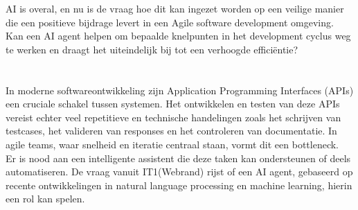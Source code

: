 AI is overal, en nu is de vraag hoe dit kan ingezet worden op een veilige manier die een positieve bijdrage levert in een Agile software development omgeving. Kan een AI agent helpen om bepaalde knelpunten in het development cyclus weg te werken en draagt het uiteindelijk bij tot een verhoogde efficiëntie?

\section{}%
\label{sec:probleemstelling}

In moderne softwareontwikkeling zijn Application Programming Interfaces (APIs) een cruciale schakel tussen systemen. Het ontwikkelen en testen van deze APIs vereist echter veel repetitieve en technische handelingen zoals het schrijven van testcases, het valideren van responses en het controleren van documentatie. In agile teams, waar snelheid en iteratie centraal staan, vormt dit een bottleneck. \\

Er is nood aan een intelligente assistent die deze taken kan ondersteunen of deels automatiseren. De vraag vanuit IT1(Webrand) rijst of een AI agent, gebaseerd op recente ontwikkelingen in natural language processing en machine learning, hierin een rol kan spelen.



\section{}%
\label{sec:onderzoeksvraag}


